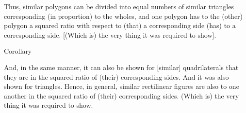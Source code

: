 \begin{Parallel}{}{}
{Thus, similar polygons can be divided into equal
numbers of similar
triangles corresponding (in proportion) to the wholes, and one
polygon has to the (other) polygon a squared ratio with respect to
(that) a corresponding side (has) to a corresponding side. [(Which is) the
very thing it was required to show].\\

\begin{center}
{\large Corollary}
\end{center}\vspace*{-7pt}

And, in the same manner, it can also be shown for [similar] quadrilaterals
that they are in the squared ratio of (their) corresponding sides. And it was also
shown for triangles. Hence, in general, similar rectilinear figures are also to one
another in the squared ratio of (their) corresponding sides. (Which is) the
very thing it was required to show.}
\end{Parallel}

